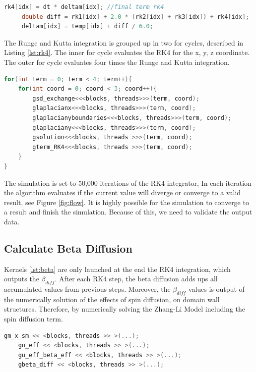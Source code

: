 \begin{lstlisting}[language=C++, label={lst:rk4cuda}, caption={4th term of the Runge and Kutta integration.}] 
     rk4[idx] = dt * deltam[idx]; //final term rk4
     double diff = rk1[idx] + 2.0 * (rk2[idx] + rk3[idx]) + rk4[idx];
     deltam[idx] = temp[idx] + diff / 6.0;	
\end{lstlisting}


The Runge and Kutta integration is grouped up in two {\listf for} cycles, described in Listing \ref{lst:rk4}. The inner {\listf for} cycle evaluates the RK4 for the x, y, z coordinate. The outer {\listf for} cycle evaluates four times the Runge and Kutta integration.

\begin{lstlisting}[language=C++, label={lst:rk4}, caption={Summarize of Runge and Kutta 4th Integration.}]
for(int term = 0; term < 4; term++){
	for(int coord = 0; coord < 3; coord++){
    	gsd_exchange<<<blocks, threads>>>(term, coord);
    	glaplacianx<<<blocks, threads>>>(term, coord);
    	glaplacianyboundaries<<<blocks, threads>>>(term, coord);
    	glaplaciany<<<blocks, threads>>>(term, coord);
    	gsolution<<<blocks, threads >>>(term, coord);
    	gterm_RK4<<<blocks, threads >>>(term, coord);
    }
}
\end{lstlisting}

 The simulation is set to 50,000 iterations of the RK4 integrator, In each iteration the algorithm evaluates if the current value will diverge or converge to a valid result, see Figure \ref{fig:flow}. It is highly possible for the simulation to converge to a result and finish the simulation. Because of this, we need to validate the output data.
 
\subsection{Calculate Beta Diffusion}

Kernels \ref{lst:beta} are only launched at the end the RK4 integration, which outputs the $\beta_{diff}$. After each RK4 step, the beta diffusion adds ups all accumulated values from previous steps. Moreover, the $\beta_{diff}$ values is output of the numerically solution of the effects of spin diffusion, on domain wall structures. Therefore, by numerically solving the Zhang-Li Model including the spin diffusion term.

\begin{lstlisting}[language=C++, label={lst:beta}, caption={Calculate beta diffusion.}]
    gm_x_sm << <blocks, threads >> >(...); 
    gu_eff << <blocks, threads >> >(...); 
    gu_eff_beta_eff << <blocks, threads >> >(...); 	
    gbeta_diff << <blocks, threads >> >(...);               
\end{lstlisting}

